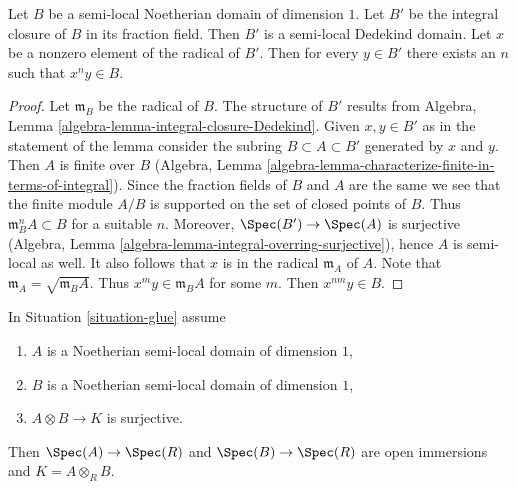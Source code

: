 \begin{lemma}
\label{lemma-semi-local-dimension-one-conductor}
Let $B$ be a semi-local Noetherian domain of dimension $1$.
Let $B'$ be the integral closure of $B$ in its fraction field.
Then $B'$ is a semi-local Dedekind domain.
Let $x$ be a nonzero element of the radical of $B'$.
Then for every $y \in B'$ there exists an $n$ such that
$x^n y \in B$.
\end{lemma}

\begin{proof}
Let $\mathfrak m_B$ be the radical of $B$. The structure of $B'$ results from
Algebra, Lemma \ref{algebra-lemma-integral-closure-Dedekind}.
Given $x, y \in B'$ as in the statement of the lemma consider
the subring $B \subset A \subset B'$ generated by $x$ and $y$.
Then $A$ is finite over $B$ (Algebra, Lemma
\ref{algebra-lemma-characterize-finite-in-terms-of-integral}).
Since the fraction fields of $B$ and $A$ are the same we see
that the finite module $A/B$ is supported on the set of
closed points of $B$. Thus $\mathfrak m_B^n A \subset B$ for
a suitable $n$. Moreover, $\Spec(B') \to \Spec(A)$ is
surjective (Algebra, Lemma \ref{algebra-lemma-integral-overring-surjective}),
hence $A$ is semi-local as well. It also follows that
$x$ is in the radical $\mathfrak m_A$ of $A$. Note that
$\mathfrak m_A = \sqrt{\mathfrak m_B A}$.
Thus $x^m y \in \mathfrak m_B A$ for some $m$.
Then $x^{nm} y \in B$.
\end{proof}

\begin{lemma}
\label{lemma-semi-local-both-side}
In Situation \ref{situation-glue} assume
\begin{enumerate}
\item $A$ is a Noetherian semi-local domain of dimension $1$,
\item $B$ is a Noetherian semi-local domain of dimension $1$,
\item $A \otimes B \to K$ is surjective.
\end{enumerate}
Then $\Spec(A) \to \Spec(R)$ and $\Spec(B) \to \Spec(R)$
are open immersions and $K = A \otimes_R B$.
\end{lemma}

